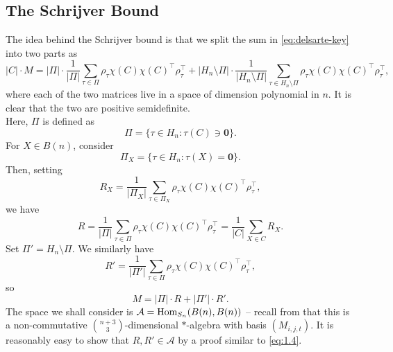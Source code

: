 \subsection{The Schrijver Bound}
\label{subsec:schrijver}

	The idea behind the Schrijver bound is that we split the sum in \cref{eq:delsarte-key} into two parts as 
	\[ |C| \cdot M = |\Pi| \cdot \frac{1}{|\Pi|} \sum_{\tau \in \Pi} \rho_\tau \chi(C) \chi(C)^\top \rho_\tau^\top + |H_n \setminus \Pi| \cdot \frac{1}{|H_n \setminus \Pi|} \sum_{\tau \in H_n \setminus \Pi} \rho_\tau \chi(C) \chi(C)^\top \rho_\tau^\top, \]
	where each of the two matrices live in a space of dimension polynomial in $n$. It is clear that the two are positive semidefinite.\\
	Here, $\Pi$ is defined as
	\[ \Pi = \{ \tau \in H_n : \tau(C) \ni \mathbf{0} \}. \]
	For $X \in B(n)$, consider
	\[ \Pi_X = \{ \tau \in H_n : \tau(X) = \mathbf{0} \}. \]
	Then, setting 
	\[ R_X = \frac{1}{|\Pi_X|} \sum_{\tau \in \Pi_X} \rho_{\tau} \chi(C) \chi(C)^\top \rho_\tau^\top, \]
	we have
	\[ R = \frac{1}{|\Pi|} \sum_{\tau \in \Pi} \rho_{\tau} \chi(C) \chi(C)^\top \rho_\tau^\top = \frac{1}{|C|} \sum_{X \in C} R_X. \]
	Set $\Pi' = H_n \setminus \Pi$. We similarly have
	\[ R' = \frac{1}{|\Pi'|} \sum_{\tau \in \Pi} \rho_{\tau} \chi(C) \chi(C)^\top \rho_\tau^\top, \]
	so
	\[ M = |\Pi| \cdot R + |\Pi'| \cdot R'. \]
	The space we shall consider is $\mathcal{A} = \operatorname{Hom}_{S_n}(B(n),B(n))$ -- recall from  that this is a non-commutative $\binom{n+3}{3}$-dimensional $*$-algebra with basis $(M_{i,j,t})$. It is reasonably easy to show that $R,R' \in \mathcal{A}$ by a proof similar to \cref{eq:1.4}.

